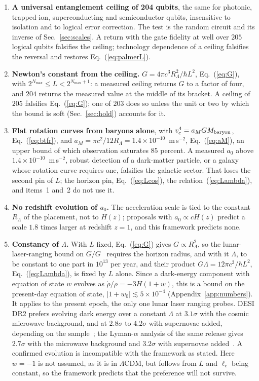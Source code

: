 \documentclass[aps,prd,twocolumn,superscriptaddress,nofootinbib,showkeys]{revtex4-2}
\newcommand{\lc}{\ell_c}
\newcommand{\RL}{R_\Lambda}
\begin{document}
\begin{enumerate}
\item \textbf{A universal entanglement ceiling of 204 qubits}, the same for photonic, trapped-ion, superconducting and semiconductor qubits, insensitive to isolation and to logical error correction. The test is the random circuit and its inverse of Sec.~\ref{sec:scales}. A return with the gate fidelity at well over $205$ logical qubits falsifies the ceiling; technology dependence of a ceiling falsifies the reversal and restores Eq.~(\ref{eq:palmerL}).
\item {\boldmath\textbf{Newton's constant from the ceiling.}} $G = 4\pi c^3\RL^2/\hbar L^2$, Eq.~(\ref{eq:G}), with $2^{N_{\max}}\le L<2^{N_{\max}+1}$: a measured ceiling returns $G$ to a factor of four, and $204$ returns the measured value at the middle of its bracket. A ceiling of $205$ falsifies Eq.~(\ref{eq:G}); one of $203$ does so unless the unit or two by which the bound is soft (Sec.~\ref{sec:hold}) accounts for it.
\item \textbf{Flat rotation curves from baryons alone}, with $v_c^4 = a_M G M_{\rm baryon}$, Eq.~(\ref{eq:btfr}), and $a_M = \pi c^2/12\RL = 1.4\times10^{-10}$~m\,s$^{-2}$, Eq.~(\ref{eq:aM}), an upper bound of which observation saturates $85$ percent. A measured $a_0$ above $1.4\times10^{-10}$~m\,s$^{-2}$, robust detection of a dark-matter particle, or a galaxy whose rotation curve requires one, falsifies the galactic sector. That loses the second pin of $L$; the horizon pin, Eq.~(\ref{eq:Lcos}), the relation~(\ref{eq:Lambda}), and items~1 and~2 do not use it.
\item {\boldmath\textbf{No redshift evolution of $a_0$.}} The acceleration scale is tied to the constant $\RL$ of the placement, not to $H(z)$; proposals with $a_0\propto cH(z)$ predict a scale $1.8$ times larger at redshift $z=1$, and this framework predicts none.
\item {\boldmath\textbf{Constancy of $\Lambda$.}} With $L$ fixed, Eq.~(\ref{eq:G}) gives $G\propto\RL^2$, so the lunar-laser-ranging bound on $\dot G/G$~\cite{hofmann2018} requires the horizon radius, and with it $\Lambda$, to be constant to one part in $10^{13}$ per year, and their product $G\Lambda = 12\pi c^3/\hbar L^2$, Eq.~(\ref{eq:Lambda}), is fixed by $L$ alone. Since a dark-energy component with equation of state $w$ evolves as $\dot\rho/\rho = -3H(1+w)$, this is a bound on the present-day equation of state, $|1+w_0| \lesssim 5\times10^{-4}$ (Appendix~\ref{app:numbers}). It applies to the present epoch, the only one lunar laser ranging probes. DESI DR2 prefers evolving dark energy over a constant $\Lambda$ at $3.1\sigma$ with the cosmic microwave background, and at $2.8\sigma$ to $4.2\sigma$ with supernovae added, depending on the sample~\cite{desi2025}; the Lyman-$\alpha$ analysis of the same release gives $2.7\sigma$ with the microwave background and $3.2\sigma$ with supernovae added~\cite{desi2026}. A confirmed evolution is incompatible with the framework as stated. Here $w=-1$ is not assumed, as it is in $\Lambda$CDM, but follows from $L$ and $\lc$ being constant, so the framework predicts that the preference will not survive.
\end{enumerate}
\end{document}
